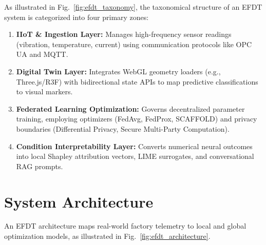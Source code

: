 \documentclass[journal,10pt,compsoc]{IEEEtran}
\begin{document}
As illustrated in Fig.~\ref{fig:efdt_taxonomy}, the taxonomical structure of an EFDT system is categorized into four primary zones:
\begin{enumerate}
    \item \textbf{IIoT \& Ingestion Layer:} Manages high-frequency sensor readings (vibration, temperature, current) using communication protocols like OPC UA and MQTT.
    \item \textbf{Digital Twin Layer:} Integrates WebGL geometry loaders (e.g., Three.js/R3F) with bidirectional state APIs to map predictive classifications to visual markers.
    \item \textbf{Federated Learning Optimization:} Governs decentralized parameter training, employing optimizers (FedAvg, FedProx, SCAFFOLD) and privacy boundaries (Differential Privacy, Secure Multi-Party Computation).
    \item \textbf{Condition Interpretability Layer:} Converts numerical neural outcomes into local Shapley attribution vectors, LIME surrogates, and conversational RAG prompts.
\end{enumerate}

\section{System Architecture}
\label{sec:architecture}

An EFDT architecture maps real-world factory telemetry to local and global optimization models, as illustrated in Fig.~\ref{fig:efdt_architecture}.
\end{document}
